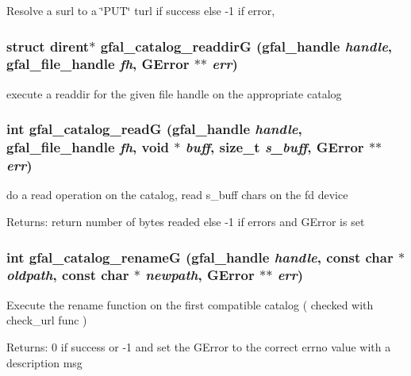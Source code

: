 Resolve a surl to a \char`\"{}PUT\char`\"{} turl  if success else -1 if error, 
\subsubsection{\setlength{\rightskip}{0pt plus 5cm}struct dirent$\ast$ gfal\_\-catalog\_\-readdir\-G (gfal\_\-handle {\em handle}, gfal\_\-file\_\-handle {\em fh}, GError $\ast$$\ast$ {\em err})}\label{gfal__common__catalog_8h_9ba0d48d73fe53d42d3a715e57473adb}


execute a readdir for the given file handle on the appropriate catalog 
\subsubsection{\setlength{\rightskip}{0pt plus 5cm}int gfal\_\-catalog\_\-read\-G (gfal\_\-handle {\em handle}, gfal\_\-file\_\-handle {\em fh}, void $\ast$ {\em buff}, size\_\-t {\em s\_\-buff}, GError $\ast$$\ast$ {\em err})}\label{gfal__common__catalog_8h_a0bc8955dc41f743a56c8d2fc68e2e1c}


do a read operation on the catalog, read s\_\-buff chars on the fd device \begin{Desc}
\item[Returns:]return number of bytes readed else -1 if errors and GError is set \end{Desc}
\subsubsection{\setlength{\rightskip}{0pt plus 5cm}int gfal\_\-catalog\_\-rename\-G (gfal\_\-handle {\em handle}, const char $\ast$ {\em oldpath}, const char $\ast$ {\em newpath}, GError $\ast$$\ast$ {\em err})}\label{gfal__common__catalog_8h_99ffb13510951a6fe79f3c33305ea189}


Execute the rename function on the first compatible catalog ( checked with check\_\-url func ) \begin{Desc}
\item[Returns:]0 if success or -1 and set the GError to the correct errno value with a description msg \end{Desc}
